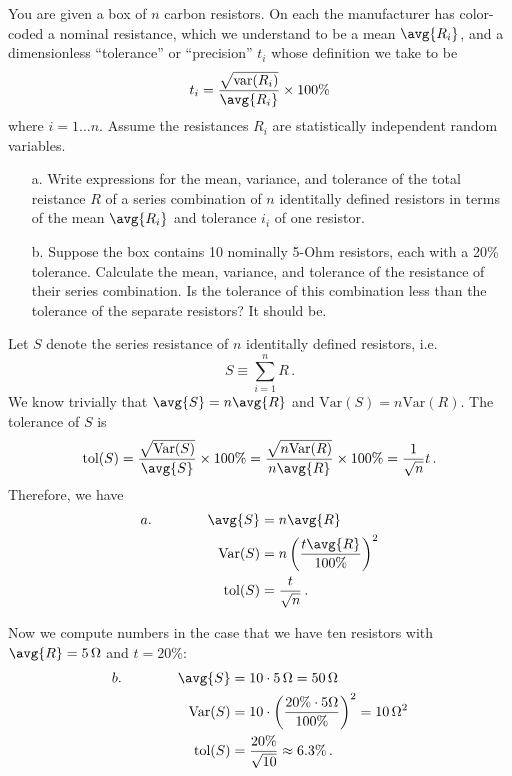 

You are given a box of $n$ carbon resistors.
On each the manufacturer has color-coded a nominal resistance, which we understand to be a mean $\avg{R_i}$, and a dimensionless ``tolerance'' or ``precision'' $t_i$ whose definition we take to be
\begin{displaymath}
  t_i = \frac{\sqrt{\text{var}(R_i)}}{\avg{R_i}} \times 100\%
\end{displaymath}
where $i=1\ldots n$.
Assume the resistances $R_i$ are statistically independent random variables.

\begin{itemize}
  \item[a.] Write expressions for the mean, variance, and tolerance of the total reistance $R$ of a series combination of $n$ identitally defined resistors in terms of the mean $\avg{R_i}$ and tolerance $i_i$ of one resistor.

  \item[b.] Suppose the box contains 10 nominally 5-Ohm resistors, each with a 20\% tolerance.
    Calculate the mean, variance, and tolerance of the resistance of their series combination.
    Is the tolerance of this combination less than the tolerance of the separate resistors?
    It should be.
\end{itemize}


Let $S$ denote the series resistance of $n$ identitally defined resistors, i.e.
\begin{equation*}
  S \equiv \sum_{i=1}^n R \, .
\end{equation*}
We know trivially that $\avg{S} = n \avg{R}$ and $\text{Var}(S) = n\text{Var}(R)$.
The tolerance of $S$ is
\begin{equation*}
  \text{tol}(S) = \frac{\sqrt{\text{Var}(S)}}{\avg{S}} \times 100\%
  = \frac{\sqrt{n \text{Var}(R)}}{n \avg{R}} \times 100\%
  = \frac{1}{\sqrt{n}} t \, .
\end{equation*}
Therefore, we have
\begin{align*}
  a. \qquad \qquad
  \avg{S} &= n \avg{R} \\
  \text{Var}(S) &= n \left( \frac{t \avg{R}}{100 \%} \right)^2 \\
  \text{tol}(S) &= \frac{t}{\sqrt{n}} \, .
\end{align*}

Now we compute numbers in the case that we have ten resistors with $\avg{R} = 5 \, \Omega$ and $t = 20\%$:
\begin{align*}
  b. \qquad \qquad
  \avg{S} &= 10 \cdot 5 \, \Omega = 50 \, \Omega \\
  \text{Var}(S) &= 10 \cdot \left( \frac{20\% \cdot 5 \Omega}{100\%} \right)^2 = 10 \, \Omega^2 \\
  \text{tol}(S) &= \frac{20\%}{\sqrt{10}} \approx 6.3\% \, .
\end{align*}
